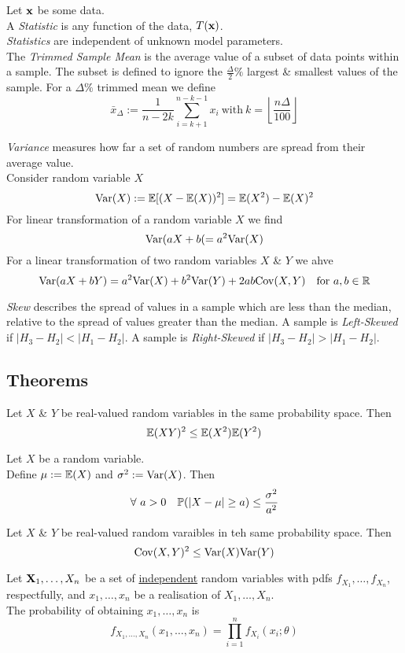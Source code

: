 \documentclass[11pt,a4paper]{article}
\begin{document}
Let $\textbf{x}$ be some data.\\
A \textit{Statistic} is any function of the data, $T(\textbf{x})$.\\
\nb \textit{Statistics} are independent of unknown model parameters.\\

The \textit{Trimmed Sample Mean} is the average value of a subset of data points within a sample. The subset is defined to ignore the $\frac{\Delta}{2}\%$ largest \& smallest values of the sample. For a $\Delta\%$ trimmed mean we define
$$\bar{x}_\Delta:=\frac{1}{n-2k}\sum_{i=k+1}^{n-k-1}x_i\ \mathrm{with}\ k=\left\lfloor\frac{n\Delta}{100}\right\rfloor$$

\textit{Variance} measures how far a set of random numbers are spread from their average value.\\
Consider random variable $X$
$$\mathrm{Var}(X):=\mathbb{E}[(X-\mathbb{E}(X))^2]=\mathbb{E}(X^2)-\mathbb{E}(X)^2$$
For linear transformation of a random variable $X$ we find
$$\mathrm{Var}(aX+b(=a^2\mathrm{Var}(X)$$
For a linear transformation of two random variables $X$ \& $Y$ we ahve
$$\mathrm{Var}(aX+bY)=a^2\mathrm{Var}(X)+b^2\mathrm{Var}(Y)+2ab\mathrm{Cov}(X,Y)\quad\text{for }a,b\in\mathbb{R}$$

\textit{Skew} describes the spread of values in a sample which are less than the median, relative to the spread of values greater than the median. A sample is \textit{Left-Skewed} if $|H_3-H_2|<|H_1-H_2|$. A sample is \textit{Right-Skewed} if $|H_3-H_2|>|H_1-H_2|$.\\

\subsection{Theorems}

Let $X$ \& $Y$ be real-valued random variables in the same probability space. Then
$$\mathbb{E}(XY)^2\leq\mathbb{E}(X^2)\mathbb{E}(Y^2)$$

Let $X$ be a random variable.\\
Define $\mu:=\mathbb{E}(X)$ and $\sigma^2:=\mathrm{Var}(X)$. Then
$$\forall\ a>0\quad\mathbb{P}(|X-\mu|\geq a)\leq\frac{\sigma^2}{a^2}$$

Let $X$ \& $Y$ be real-valued random varaibles in teh same probability space. Then
$$\mathrm{Cov}(X,Y)^2\leq\mathrm{Var}(X)\mathrm{Var}(Y)$$

Let $\textbf{X}_1,\dots,X_n$ be a set of \underline{independent} random variables with pdfs $f_{X_1},\dots,f_{X_n}$, respectfully, and $x_1,\dots,x_n$ be a realisation of $X_1,\dots,X_n$.\\
The probability of obtaining $x_1,\dots,x_n$ is
$$f_{X_1,\dots,X_n}(x_1,\dots,x_n)=\prod_{i=1}^nf_{X_i}(x_i;\theta)$$
\end{document}
